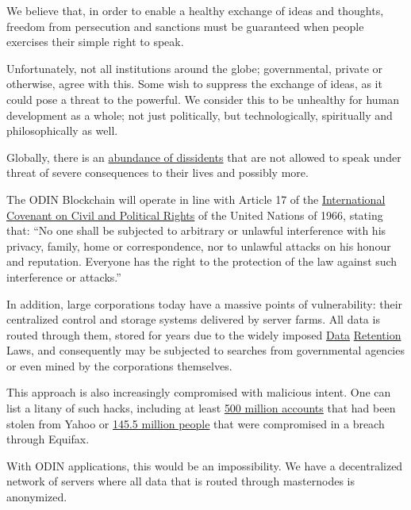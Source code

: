 We believe that, in order to enable a healthy exchange of ideas and thoughts, freedom from persecution and sanctions must be guaranteed when people exercises their simple right to speak. 

Unfortunately, not all institutions around the globe; governmental, private or otherwise, agree with this. Some wish to suppress the exchange of ideas, as it could pose a threat to the powerful. We consider this to be unhealthy for human development as a whole; not just politically, but technologically, spiritually and philosophically as well.

Globally, there is an \href{https://foreignpolicy.com/2010/05/07/the-worlds-top-dissidents/}{abundance of dissidents} that are not allowed to speak under threat of severe consequences to their lives and possibly more.

The ODIN Blockchain will operate in line with Article 17 of the \href{https://www.ohchr.org/EN/ProfessionalInterest/Pages/CCPR.aspx}{International Covenant on Civil and Political Rights} of the United Nations of 1966, stating that: ``No one shall be subjected to arbitrary or unlawful interference with his privacy, family, home or correspondence, nor to unlawful attacks on his honour and reputation. Everyone has the right to the protection of the law against such interference or attacks.''

In addition, large corporations today have a massive points of vulnerability: their centralized control and storage systems delivered by server farms. All data is routed through them, stored for years due to the widely imposed \href{http://fra.europa.eu/en/theme/information-society-privacy-and-data-protection/data-retention}{Data} \href{https://sydney.edu.au/news-opinion/news/2017/07/31/new-data-retention-law-seriously-invades-our-privacy.html}{Retention} Laws, and consequently may be subjected to searches from governmental agencies or even mined by the corporations themselves.

This approach is also increasingly compromised with malicious intent. One can list a litany of such hacks, including at least \href{http://money.cnn.com/2016/09/22/technology/yahoo-data-breach/?iid=EL}{500 million accounts} that had been stolen from Yahoo or \href{http://money.cnn.com/2017/10/02/technology/business/equifax-million-more-impacted/index.html?iid=EL}{145.5 million people} that were compromised in a breach through Equifax.

With ODIN applications, this would be an impossibility. We have a decentralized network of servers where all data that is routed through masternodes is anonymized.

